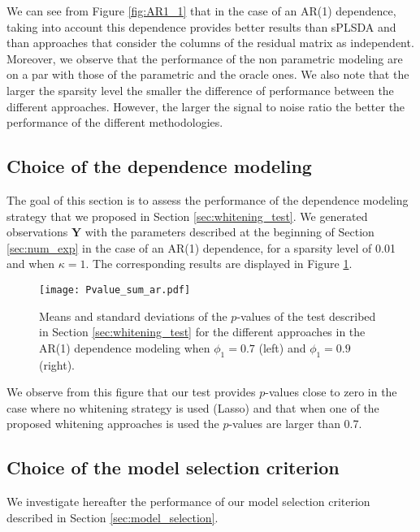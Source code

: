 We can see  from Figure \ref{fig:AR1_1} that in the  case of an AR(1)
dependence,  taking  into  account  this  dependence  provides  better
results  than \textsf{sPLSDA} and than  approaches that consider  the  columns of  the  residual  matrix  as
independent.  Moreover,  we  observe  that  the
performance of the non parametric modeling  are on a par with those of
the parametric and the oracle ones.   We also note that the larger the
sparsity level the  smaller the difference of  performance between the
different approaches.  However,  the larger the signal  to noise ratio
the better the performance of the different methodologies.

\subsection{Choice of the dependence modeling}

The goal of this section is to assess the performance of the dependence modeling
strategy that we proposed in Section \ref{sec:whitening_test}. We
generated observations $\boldsymbol{Y}$ with the parameters described
at the beginning of Section \ref{sec:num_exp} in the case of an AR(1)
dependence, for a sparsity level of 0.01 and when $\kappa=1$. The corresponding results are displayed
in Figure \ref{fig:test}.


\begin{figure}[!h]
\centering
\texttt{[image: Pvalue\_sum\_ar.pdf]}
\caption{Means and standard deviations of the $p$-values of the test
   described in Section \ref{sec:whitening_test} for the different
   approaches in the AR(1) dependence modeling when $\phi_1=0.7$ (left)
   and $\phi_1=0.9$ (right).\label{fig:test}}
\end{figure}

We observe from this figure that our test provides
$p$-values close to zero in the case where no whitening strategy is
used (\textsf{Lasso}) and that when one of the proposed whitening
approaches is used the $p$-values are larger than 0.7. 


\subsection{Choice of the model selection criterion}

We investigate hereafter the performance of our model selection
criterion described in Section \ref{sec:model_selection}.

